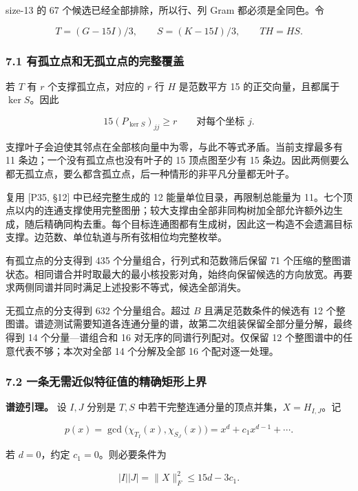 \documentclass[
  11pt,
  a4paper,
]{article}
\begin{document}
size-13 的 67 个候选已经全部排除，所以行、列 Gram 都必须是全同色。令

\[T=(G-15I)/3,\qquad S=(K-15I)/3,\qquad TH=HS.\]

\subsubsection{7.1
有孤立点和无孤立点的完整覆盖}\label{ux6709ux5b64ux7acbux70b9ux548cux65e0ux5b64ux7acbux70b9ux7684ux5b8cux6574ux8986ux76d6}

若 \(T\) 有 \(r\) 个支撑孤立点，对应的 \(r\) 行 \(H\) 是范数平方 15
的正交向量，且都属于 \(\ker S\)。因此

\[15(P_{\ker S})_{jj}\ge r\qquad\text{对每个坐标 }j.\]

支撑叶子会迫使其邻点在全部核向量中为零，与此不等式矛盾。当前支撑最多有
11 条边；一个没有孤立点也没有叶子的 15 顶点图至少有 15
条边。因此两侧要么都无孤立点，要么都含孤立点，后一种情形的非平凡分量都无叶子。

复用 {[}P35, §12{]} 中已经完整生成的 12 能量单位目录，再限制总能量为
11。七个顶点以内的连通支撑使用完整图册；较大支撑由全部非同构树加全部允许额外边生成，随后精确同构去重。每个目标连通图都有生成树，因此这一构造不会遗漏目标支撑。边范数、单位轨道与所有弦相位均完整枚举。

有孤立点的分支得到 435 个分量组合，行列式和范数筛后保留 71
个压缩的整图谱状态。相同谱合并时取最大的最小核投影对角，始终向保留候选的方向放宽。再要求两侧同谱并同时满足上述投影不等式，候选全部消失。

无孤立点的分支得到 632 个分量组合。超过 \(B\) 且满足范数条件的候选有 12
个整图谱。谱迹测试需要知道各连通分量的谱，故第二次组装保留全部分量分解，最终得到
14 个分量---谱组合和 16 对无序的同谱行列配对。仅保留 12
个整图谱中的任意代表不够；本次对全部 14 个分解及全部 16 个配对逐一处理。

\subsubsection{7.2
一条无需近似特征值的精确矩形上界}\label{ux4e00ux6761ux65e0ux9700ux8fd1ux4f3cux7279ux5f81ux503cux7684ux7cbeux786eux77e9ux5f62ux4e0aux754c}

\textbf{谱迹引理。} 设 \(I,J\) 分别是 \(T,S\)
中若干完整连通分量的顶点并集，\(X=H_{I,J}\)。记

\[p(x)=\gcd\bigl(\chi_{T_I}(x),\chi_{S_J}(x)\bigr)
=x^d+c_1x^{d-1}+\cdots.\]

若 \(d=0\)，约定 \(c_1=0\)。则必要条件为

\[\boxed{|I||J|=\|X\|_F^2\le15d-3c_1.}\]
\end{document}
